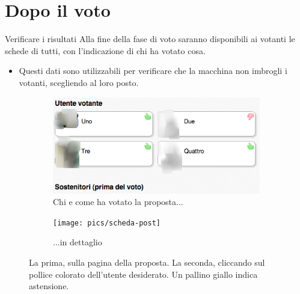 \documentclass[ignorenonframetext,11pt]{beamer}\usetheme{default}
\begin{document}
\section{Dopo il voto}
\begin{frame}{Verificare i risultati}
Alla fine della fase di voto saranno disponibili ai votanti le schede di tutti, con l'indicazione di chi ha votato cosa.

\begin{itemize}\item Questi dati sono utilizzabili per verificare che la macchina non imbrogli i votanti, scegliendo al loro posto.\end{itemize}
\begin{figure}
	\begin{subfigure}[b]{.58\textwidth}
		\includegraphics[width=\textwidth,]{pics/voters}
		\caption{Chi e come ha votato la proposta...}
	\end{subfigure}
	\begin{subfigure}[b]{.34\textwidth}
		\texttt{[image: pics/scheda-post]}
		\caption{...in dettaglio}
	\end{subfigure}
\caption{La prima, sulla pagina della proposta. La seconda, cliccando sul pollice colorato dell'utente desiderato. Un pallino giallo indica astensione.}
\end{figure}
\end{frame}
\end{document}
